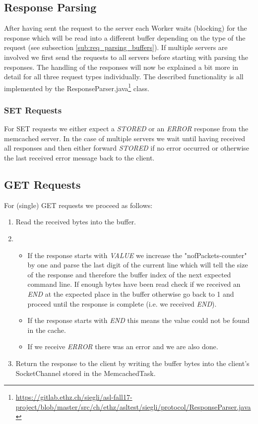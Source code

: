 \documentclass[11pt,a4paper]{article}
\let\ti\textit
\begin{document}
\subsection{Response Parsing}\label{sub:resp_parsing}
After having sent the request to the server each Worker waits (blocking) for the response which will be read into a different buffer depending on the type of the request (see subsection \ref{sub:req_parsing_buffers}). If multiple servers are involved we first send the requests to all servers before starting with parsing the responses. The handling of the responses will now be explained a bit more in detail for all three request types individually. The described functionality is all implemented by the ResponseParser.java\footnote{\url{https://gitlab.ethz.ch/siegli/asl-fall17-project/blob/master/src/ch/ethz/asltest/siegli/protocol/ResponseParser.java}} class.


\subsubsection*{SET Requests}
For SET requests we either expect a \ti{STORED} or an \ti{ERROR} response from the memcached server. In the case of multiple servers we wait until having received all responses and then either forward \ti{STORED} if no error occurred or otherwise the last received error message back to the client.

\subsection*{GET Requests}
For (single) GET requests we proceed as follows:
\begin{enumerate}
    \item Read the received bytes into the buffer.
    \item \begin{itemize}
        \item If the response starts with \ti{VALUE} we increase the "nofPackets-counter" by one and parse the last digit of the current line which will tell the size of the response and therefore the buffer index of the next expected command line. If enough bytes have been read check if we received an \ti{END} at the expected place in the buffer otherwise go back to 1 and proceed until the response is complete (i.e. we received \ti{END}).
        \item If the response starts with \ti{END} this means the value could not be found in the cache.  
        \item If we receive \ti{ERROR} there was an error and we are also done.
    \end{itemize}
    \item Return the response to the client by writing the buffer bytes into the client's SocketChannel stored in the MemcachedTask.
\end{enumerate}
\end{document}
